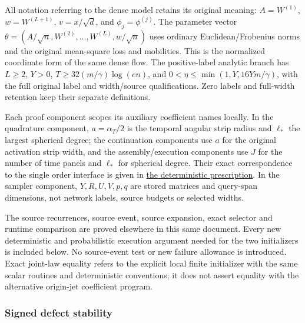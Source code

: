 
All notation referring to the dense model retains its original meaning: \(A=W^{(1)}\), \(w=W^{(L+1)}\), \(v=x/\sqrt d\), and \(\phi_j=\phi^{(j)}\). The parameter vector \(\theta=(A/\sqrt n,\allowbreak W^{(2)},\allowbreak \ldots,\allowbreak W^{(L)},\allowbreak w/\sqrt n)\) uses ordinary Euclidean/\allowbreak Frobenius norms and the original mean-square loss and mobilities. This is the normalized coordinate form of the same dense flow. The positive-label analytic branch has \(L\ge2\), \(Y>0\), \(T\ge32(m/\gamma)\log(en)\), and \(0<\eta\le\min(1,\allowbreak Y,\allowbreak 16Ym/\gamma)\), with the full original label and width/source qualifications. Zero labels and full-width retention keep their separate definitions.



Each proof component scopes its auxiliary coefficient names locally. In the quadrature component, \(a=\alpha_T/2\) is the temporal angular strip radius and \(\ell_*\) the largest spherical degree; the continuation components use \(a\) for the original activation strip width, and the assembly/execution components use \(J\) for the number of time panels and \(\ell_*\) for spherical degree. Their exact correspondence to the single order interface is given in \hyperref[int:setup-orders]{the deterministic prescription}. In the sampler component, \(Y,\allowbreak R,\allowbreak U,\allowbreak V,\allowbreak p,\allowbreak q\) are stored matrices and query-span dimensions, not network labels, source budgets or selected widths.



The source recurrences, source event, source expansion, exact selector and runtime comparison are proved elsewhere in this same document. Every new deterministic and probabilistic execution argument needed for the two initializers is included below. No source-event test or new failure allowance is introduced. Exact joint-law equality refers to the explicit local finite initializer with the same scalar routines and deterministic conventions; it does not assert equality with the alternative origin-jet coefficient program.


\subsubsection{Signed defect stability}
\label{int:setup-stability}

